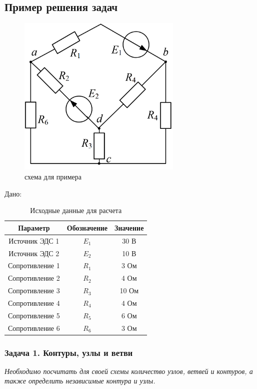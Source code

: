 \subsection{Пример решения задач}

\begin{figure}[H]
    \centering
    \includegraphics[width=0.7\textwidth]{images/30_task.png}
    \caption{схема для примера}
    \label{fig:example}
\end{figure}
Дано:
\begin{table}[H]
\centering
\begin{tabular}{|c|c|c|}
\hline
\textbf{Параметр} & \textbf{Обозначение} & \textbf{Значение} \\
\hline
Источник ЭДС 1 & $E_1$ & 30 В \\
\hline
Источник ЭДС 2 & $E_2$ & 10 В \\
\hline
Сопротивление 1 & $R_1$ & 3 Ом \\
\hline
Сопротивление 2 & $R_2$ & 4 Ом \\
\hline
Сопротивление 3 & $R_3$ & 10 Ом \\
\hline
Сопротивление 4 & $R_4$ & 4 Ом \\
\hline
Сопротивление 5 & $R_5$ & 6 Ом \\
\hline
Сопротивление 6 & $R_6$ & 3 Ом \\
\hline
\end{tabular}
\caption{Исходные данные для расчета}
\label{tab:initial_data}
\end{table}

\subsubsection{Задача 1. Контуры, узлы и ветви}
\textit{Необходимо посчитать для своей схемы количество узлов, ветвей и контуров, а также определить независимые контура и узлы.}

